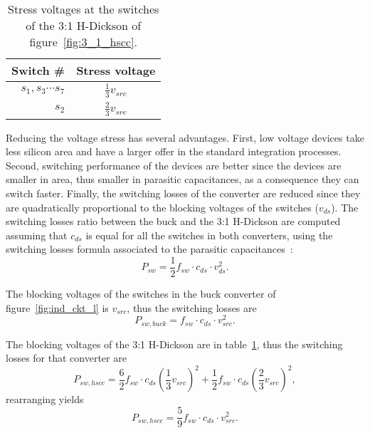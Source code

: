 \begin{table}[h]
\centering
\caption{Stress voltages at the switches of the 3:1 H-Dickson of figure~\ref{fig:3_1_hscc}.}
\label{tab:3:1 H-Dick_V_stress}
\renewcommand{\arraystretch}{1.5}%
\begin{tabular}{r  c }
 Switch \# & Stress voltage  \\
 \midrule
 $s_1,s_3 \cdots s_7$ & $\frac{1}{3} v_{src}$ \\
 $s_2$ & $\frac{2 }{3} v_{src}$
\end{tabular}
\end{table}

Reducing the voltage stress has several advantages. First, low voltage devices take less silicon area and have a larger offer in the standard integration processes. Second, switching performance of the devices are better since the devices are smaller in area, thus smaller in parasitic capacitances, as a consequence they can switch faster. Finally, the switching losses of the converter are reduced since they are quadratically proportional to the blocking voltages of the switches ($v_{ds}$).  The switching losses ratio between the buck and the 3:1 H-Dickson are computed  assuming that $c_{ds}$ is equal for all the switches in both converters, using the switching losses formula associated to the parasitic  capacitances~\cite{2001fundamentals_erickson}:
\begin{equation}
P_{sw} = \frac{1}{2} f_{sw} \cdot c_{ds} \cdot v_{ds}^2.
\label{eq:p_sw_dev}
\end{equation}

The blocking voltages of the switches in the buck converter of figure~\ref{fig:ind_ckt_l} is $v_{src}$, thus the switching losses are
\begin{equation}
P_{sw,buck} =   f_{sw} \cdot c_{ds} \cdot v_{src}^2.
\label{eq:p_sw_buck}
\end{equation}

The blocking voltages of the 3:1 H-Dickson are in table~\ref{tab:3:1 H-Dick_V_stress}, thus the switching losses for that converter are
\begin{equation}
P_{sw,hscc} =  \frac{6}{2}  f_{sw} \cdot c_{ds} \left( \frac{1}{3} v_{src} \right)^2 + \frac{1}{2}  f_{sw} \cdot c_{ds} \left( \frac{2}{3} v_{src} \right)^2 ,
\label{eq:p_sw_hscc}
\end{equation}
rearranging yields
\begin{equation}
P_{sw,hscc} =  \frac{5}{9}  f_{sw} \cdot c_{ds} \cdot v_{src}^2.
\label{eq:p_sw_hscc_sol}
\end{equation}

